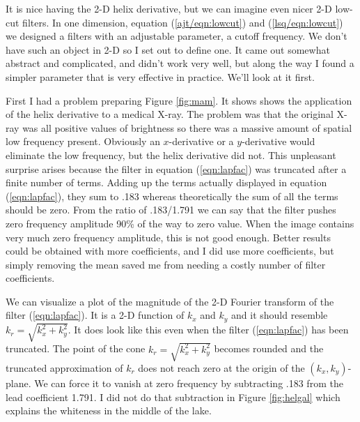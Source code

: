 
\par
It is nice having the 2-D helix derivative,
but we can imagine even nicer 2-D low-cut filters.
In one dimension,
equation 
(\ref{ajt/eqn:lowcut})
and
(\ref{lsq/eqn:lowcut})
we designed a filters with an adjustable parameter,
a cutoff frequency.
We don't have such an object in 2-D so
I set out to define one.
It came out somewhat
abstract and complicated,
and didn't work very well, 
but along the way
I found a simpler parameter that is very effective in practice.
We'll look at it first.


\par
First I had a problem preparing Figure \ref{fig:mam}.
It shows shows the application of the helix derivative
to a medical X-ray.
The problem was that the original X-ray was all positive
values of brightness so there was a massive amount of
spatial low frequency present.
Obviously an $x$-derivative or a $y$-derivative would
eliminate the low frequency, but the helix derivative did not.
This unpleasant surprise arises
because the filter in equation
(\ref{eqn:lapfac})
was truncated after a finite number of terms.
Adding up the terms actually displayed in equation
(\ref{eqn:lapfac}),
they sum to .183 whereas theoretically the sum of all the terms should be zero.
From the ratio of .183/1.791 we can say that the filter
pushes zero frequency amplitude 90\% of the way to zero value.
When the image contains very much zero frequency amplitude,
this is not good enough.
Better results could be obtained with more coefficients,
and I did use more coefficients,
but simply removing the mean saved me
from needing a costly number of filter coefficients.


\par
We can visualize a plot of the magnitude of the 2-D
Fourier transform of the filter
(\ref{eqn:lapfac}).
It is a 2-D function of $k_x$ and $k_y$ and it should
resemble $k_r=\sqrt{k_x^2+k_y^2}$.
It does look like this even when the filter
(\ref{eqn:lapfac})
has been truncated.
The point of the cone $k_r=\sqrt{k_x^2+k_y^2}$ becomes
rounded and the truncated approximation of
$k_r$ does not reach zero at the origin of the $(k_x,k_y)$-plane.
We can force it to vanish at zero frequency
by subtracting .183 from the lead coefficient 1.791.
I did not do that subtraction in Figure
\ref{fig:helgal}
which explains the whiteness in the middle of the lake.

